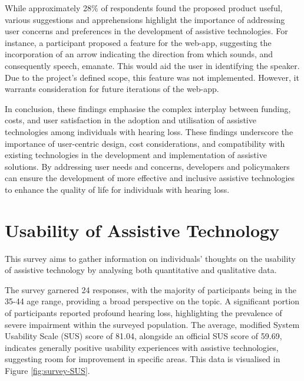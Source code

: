 \documentclass{l4proj}
\begin{document}
While approximately 28\% of respondents found the proposed product useful, various suggestions and apprehensions highlight the importance of addressing user concerns and preferences in the development of assistive technologies. For instance, a participant proposed a feature for the web-app, suggesting the incorporation of an arrow indicating the direction from which sounds, and consequently speech, emanate. This would aid the user in identifying the speaker. Due to the project's defined scope, this feature was not implemented. However, it warrants consideration for future iterations of the web-app.

In conclusion, these findings emphasise the complex interplay between funding, costs, and user satisfaction in the adoption and utilisation of assistive technologies among individuals with hearing loss. These findings underscore the importance of user-centric design, cost considerations, and compatibility with existing technologies in the development and implementation of assistive solutions. By addressing user needs and concerns, developers and policymakers can ensure the development of more effective and inclusive assistive technologies to enhance the quality of life for individuals with hearing loss.

\section{Usability of Assistive Technology}
\label{sec:use-survey}

This survey aims to gather information on individuals' thoughts on the usability of assistive technology by analysing both quantitative and qualitative data. 

The survey garnered 24 responses, with the majority of participants being in the 35-44 age range, providing a broad perspective on the topic. A significant portion of participants reported profound hearing loss, highlighting the prevalence of severe impairment within the surveyed population. The average, modified System Usability Scale (SUS) score of 81.04, alongside an official SUS score of 59.69, indicates generally positive usability experiences with assistive technologies, suggesting room for improvement in specific areas. This data is visualised in Figure \ref{fig:survey-SUS}.
\end{document}
